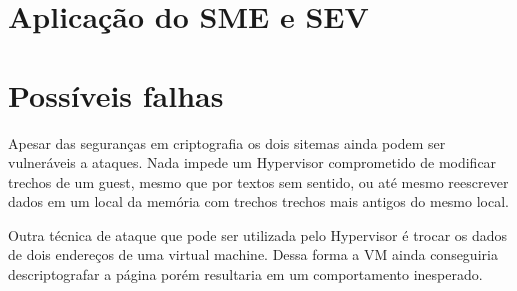 \documentclass{report}
\begin{document}
\section{Aplicação do SME e SEV}

\section{Possíveis falhas}

Apesar das seguranças em criptografia os dois sitemas ainda podem ser
vulneráveis a ataques. Nada impede um Hypervisor comprometido de modificar
trechos de um guest, mesmo que por textos sem sentido, ou até mesmo reescrever
dados em um local da memória com trechos trechos mais antigos do mesmo local.

Outra técnica de ataque que pode ser utilizada pelo Hypervisor é trocar os
dados de dois endereços de uma virtual machine. Dessa forma a VM ainda
conseguiria descriptografar a página porém resultaria em um comportamento
inesperado.




\nocite{*}

\end{document}

